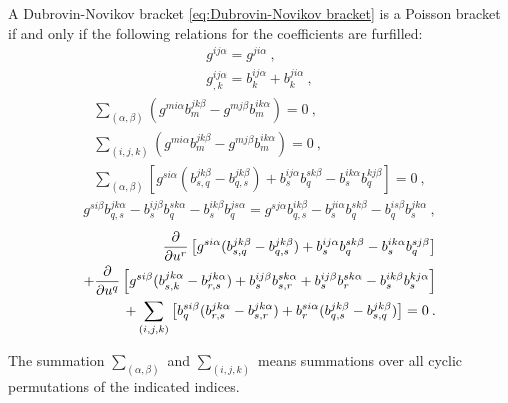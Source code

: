 \begin{theorem}[Mokhov]
    A Dubrovin-Novikov bracket \eqref{eq:Dubrovin-Novikov bracket} is a Poisson bracket if and only if the following relations for the coefficients are furfilled:
    \begin{align}
        g^{ij \alpha} = g^{ji \alpha} \:, \label{eq:Mochov-A} \\
        g^{ij \alpha}_{,k} = b^{ij \alpha}_k + b^{ji \alpha}_k \:, \label{eq:Mochov-B}
    \end{align}
    \begin{align}
        \sum_{(\alpha, \beta)} (g^{mi \alpha} b^{jk \beta}_m - g^{m j \beta} b^{i k \alpha}_m) = 0 \:, \label{eq:Mochov-C}\\
        \sum_{(i,j,k)} (g^{mi \alpha} b^{jk \beta}_m - g^{m j \beta} b^{ik \alpha}_m) = 0 \:, \label{eq:Mochov-D}\\
        \sum_{(\alpha, \beta)} \left[ g^{si \alpha} (b^{jk \beta}_{s,q} - b^{jk \beta}_{q,s} ) + b^{ij \alpha}_s b^{s k \beta}_q - b^{i k \alpha}_s b^{k j \beta}_q \right] = 0 \label{eq:Mochov-E}\:,
    \end{align}
    \begin{align}
        g^{si \beta} b^{j k \alpha}_{q,s} - b^{ij \beta}_s b^{s k \alpha}_q - b^{i k \beta}_s b^{j s \alpha}_q = g^{s j \alpha} b^{i k \beta}_{q,s} - b^{ji \alpha}_s b^{s k \beta}_q - b^{is \beta}_q b^{jk \alpha}_s \label{eq:Mochov-F}\:,
    \end{align}
    \begin{align}
        \frac{\partial }{\partial u^r} \left[ g^{si \alpha} (b^{j k \beta}_{s,q} - b^{j k \beta}_{q,s}) + b^{ij \alpha}_s b^{s k \beta}_q - b^{i k \alpha}_s b^{s j \beta}_q \right] 
        \nonumber \\+ \frac{\partial }{\partial u^q} \left[ g^{si \beta} (b^{j k  \alpha}_{s,k} - b^{j k \alpha}_{r,s}) + b^{ij \beta}_s b^{s k \alpha}_{s,r} + b^{ij \beta}_s b^{s k \alpha}_r - b^{i k \beta}_s b^{k j \alpha}_s \right] \label{eq:Mochov-G}
        \\+ \sum_{(i,j,k)} \left[ b^{si \beta}_q (b^{j k \alpha}_{r,s} - b^{j k \alpha}_{s,r}) + b^{s i \alpha}_r (b^{j k \beta}_{q,s} - b^{j k \beta}_{s,q}) \right] \nonumber
        = 0 \:.
    \end{align}
\end{theorem}
The summation $\sum_{(\alpha, \beta)}$ and $\sum_{(i,j,k)}$ means summations over all cyclic permutations of the indicated indices.

